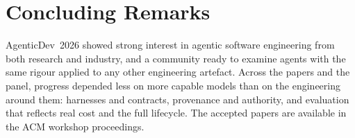 \section{Concluding Remarks}
\label{sec:conclusion}

AgenticDev~2026 showed strong interest in agentic software engineering from both research and industry, and a community ready to examine agents with the same rigour applied to any other engineering artefact. Across the papers and the panel, progress depended less on more capable models than on the engineering around them: harnesses and contracts, provenance and authority, and evaluation that reflects real cost and the full lifecycle. The accepted papers are available in the ACM workshop proceedings.
